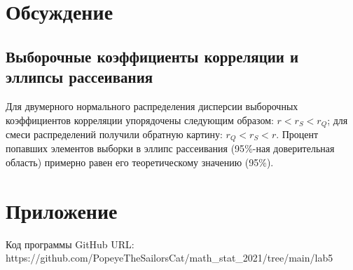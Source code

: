 \documentclass{article}
\begin{document}
\section{Обсуждение}
\subsection{Выборочные коэффициенты корреляции и эллипсы рассеивания}
\noindent Для двумерного нормального распределения дисперсии выборочных коэффициентов корреляции упорядочены следующим образом: $r < r_{S} < r_{Q}$; для смеси распределений получили обратную картину: $r_{Q} < r_{S} < r$.
\newline
\noindent Процент попавших элементов выборки в эллипс рассеивания (95$\%$-ная доверительная область) примерно равен его теоретическому значению (95$\%$).

\section{Приложение}
\noindent Код программы GitHub URL:\\https://github.com/PopeyeTheSailorsCat/math\_stat\_2021/tree/main/lab5
\newline
\end{document}
